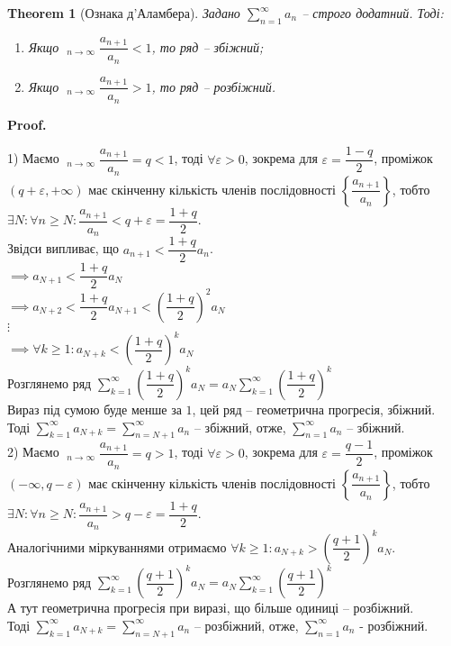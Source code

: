 \documentclass[a4paper, 10pt]{article}
\makeatletter
\DeclareMathOperator*\uplim{\overline{lim}}
\DeclareMathOperator*\downlim{\underline{lim}}
\def\huge{\displaystyle}
\def\qed{$\blacksquare$}
\theoremstyle{theoremdd}
\newtheorem{theorem}{Theorem}[subsection]
\theoremstyle{theoremdd}
\theoremstyle{theoremdd}
\theoremstyle{theoremdd}
\theoremstyle{theoremdd}
\theoremstyle{theoremdd}
\theoremstyle{theoremdd}
\theoremstyle{theoremdd}
\theoremstyle{theoremdd}
\renewenvironment{proof}[1][Proof.\\]{\par
\pushQED{\hfill \qed}%
\normalfont \topsep6\p@\@plus6\p@\relax
\trivlist
\item\relax
{\bfseries
#1\@addpunct{.}}\hspace\labelsep\ignorespaces
}{%
\popQED\endtrivlist\@endpefalse
}
\makeatother
\begin{document}
\begin{theorem}[Ознака д'Аламбера]
Задано $\huge \sum_{n=1}^{\infty} a_n$ -- строго додатний. Тоді:
\begin{enumerate}[nosep,wide=0pt,label={\arabic*)}]
\item Якщо $\huge\uplim_{n \to \infty} \dfrac{a_{n+1}}{a_n} <1$, то ряд -- збіжний;
\item Якщо $\huge\downlim_{n \to \infty} \dfrac{a_{n+1}}{a_n} >1$, то ряд -- розбіжний.
\end{enumerate}
\end{theorem}

\begin{proof}
1) Маємо $\huge\uplim_{n \to \infty} \dfrac{a_{n+1}}{a_n} = q < 1$, тоді $\forall \varepsilon > 0$, зокрема для $\varepsilon = \dfrac{1-q}{2}$, проміжок $(q+\varepsilon,+\infty)$ має скінченну кількість членів послідовності $\left\{ \dfrac{a_{n+1}}{a_n} \right\}$, тобто $\exists N: \forall n \geq N: \dfrac{a_{n+1}}{a_n} < q+\varepsilon = \dfrac{1+q}{2}$.\\
Звідси випливає, що $a_{n+1} < \dfrac{1+q}{2}a_n$.\\
$\implies a_{N+1} < \dfrac{1+q}{2}a_N$\\
$\implies a_{N+2} < \dfrac{1+q}{2}a_{N+1} < \left( \dfrac{1+q}{2} \right)^2 a_N$\\
$\vdots$\\
$\implies \forall k \geq 1: a_{N+k} < \left( \dfrac{1+q}{2} \right)^k a_N$\\
Розглянемо ряд $\huge \sum_{k=1}^{\infty} \left( \dfrac{1+q}{2} \right)^k a_N = a_N \sum_{k=1}^{\infty} \left( \dfrac{1+q}{2} \right)^k$\\
Вираз під сумою буде менше за $1$, цей ряд -- геометрична прогресія, збіжний.\\
Тоді $\huge \sum_{k=1}^{\infty} a_{N+k} = \sum_{n = N+1}^{\infty} a_{n}$ -- збіжний, отже, $\huge \sum_{n = 1}^{\infty} a_n$ -- збіжний.
\bigskip \\
2) Маємо $\huge\downlim_{n \to \infty} \dfrac{a_{n+1}}{a_n} = q > 1$, тоді $\forall \varepsilon > 0$, зокрема для $\varepsilon = \dfrac{q-1}{2}$, проміжок $(-\infty,q-\varepsilon)$ має скінченну кількість членів послідовності $\left\{ \dfrac{a_{n+1}}{a_n} \right\}$, тобто $\exists N: \forall n \geq N: \dfrac{a_{n+1}}{a_n} > q-\varepsilon = \dfrac{1+q}{2}$.\\
Аналогічними міркуваннями отримаємо $\forall k \geq 1: a_{N+k} > \left( \dfrac{q+1}{2} \right)^k a_N$.\\
Розглянемо ряд $\huge \sum_{k=1}^{\infty} \left( \dfrac{q+1}{2} \right)^k a_N = a_N \sum_{k=1}^{\infty} \left( \dfrac{q+1}{2} \right)^k$\\
А тут геометрична прогресія при виразі, що більше одиниці -- розбіжний.\\
Тоді $\huge \sum_{k=1}^{\infty} a_{N+k} = \sum_{n = N+1}^{\infty} a_{n}$ -- розбіжний, отже, $\huge \sum_{n = 1}^{\infty} a_n$ - розбіжний.
\end{proof}
\end{document}
